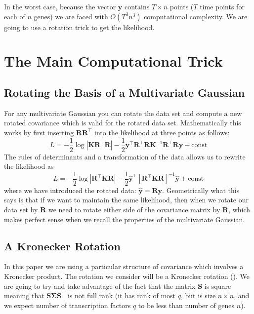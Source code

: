 In the worst case, because the vector $\mathbf{y}$ contains $T\times n$ points ($T$ time points for 
each of $n$ genes) we are faced with $O(T^3n^3)$ computational complexity. We are going to use a rotation trick to 
get the likelihood. 

\section{The Main Computational Trick}

\subsection{Rotating the Basis of a Multivariate Gaussian}
For any multivariate Gaussian you can rotate the data set and compute a new rotated covariance which is valid for the 
rotated data set. Mathematically this works by first inserting $\mathbf{R}\mathbf{R}^\top$ into the likelihood at 
three points as follows:
\begin{equation} \label{eq:LikelihoodRotation}
  L = -\frac{1}{2} \log |\mathbf{K}\mathbf{R}^\top\mathbf{R}| 
      - \frac{1}{2} \mathbf{y}^\top\mathbf{R}^\top\mathbf{R} \mathbf{K}^{-1}\mathbf{R}^\top\mathbf{R} \mathbf{y} 
      + \text{const}
\end{equation}
The rules of determinants and a transformation of the data allows us to rewrite the likelihood as
\begin{equation} \label{eq:LikelihoodRotationRerite}
  L = -\frac{1}{2} \log |\mathbf{R}^\top\mathbf{K}\mathbf{R}| 
      - \frac{1}{2} \hat{\mathbf{y}}^\top \left[\mathbf{R}^\top\mathbf{K}\mathbf{R}\right]^{-1}\hat{\mathbf{y}} 
      + \text{const}
\end{equation}
where we have introduced the rotated data: $\hat{\mathbf{y}}=\mathbf{R} \mathbf{y}$. 
Geometrically what this says is that if we want to maintain the same likelihood, then when we rotate our data set by 
$\mathbf{R}$ we need to rotate either side of the covariance matrix by $\mathbf{R}$, which makes perfect sense 
when we recall the properties of the multivariate Gaussian. 

\subsection{A Kronecker Rotation}
In this paper we are using a particular structure of covariance which involves a Kronecker product. 
The rotation we consider will be a Kronecker rotation (\cite{Stegle:2011}). 
We are going to try and take advantage of the fact that the matrix $\mathbf{S}$ is square meaning that 
$\mathbf{S}\boldsymbol{\Sigma}\mathbf{S}^\top$ is not full rank (it has rank of most $q$, but is size $n\times n$, and 
we expect number of transcription factors $q$ to be less than number of genes $n$). 

